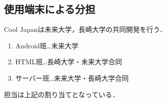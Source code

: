 \subsection{使用端末による分担}
\par
Cool Japanは未来大学，長崎大学の共同開発を行う．
\begin{enumerate}
\item Android班…未来大学
\item HTML班…長崎大学・未来大学合同
\item サーバー班…未来大学・長崎大学合同
\end{enumerate}
\par
担当は上記の割り当てとなっている．
